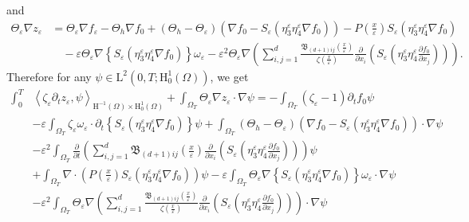 \documentclass[preprint, 12pt]{amsart}
\numberwithin{equation}{section}
\numberwithin{equation}{section}
\newcommand{\xeps}{\left(\frac{x}{\varepsilon}\right)}
\newcommand{\eps}{\varepsilon}
\begin{document}
and
\begin{equation*}
\begin{aligned}
\Theta_\eps \nabla z_\eps 
& = \Theta_\eps \nabla f_\eps
- \Theta_h \nabla f_0 
+ \left(\Theta_h - \Theta_\eps\right) \left( \nabla f_0 - S_\eps \left( \eta_3^\eps \eta_4^\eps \nabla f_0 \right) \right)
- P\xeps S_\eps \left( \eta_3^\eps \eta_4^\eps \nabla f_0 \right)
\\
& \quad 
- \eps \Theta_\eps \nabla \left\{S_\eps \left( \eta_3^\eps \eta_4^\eps \nabla f_0 \right)\right\} \omega_\eps
- \eps^2 \Theta_\eps\nabla \left(\sum_{i,j=1}^d \frac{\mathfrak{B}_{(d+1)ij}\xeps}{\zeta\xeps} \frac{\partial}{\partial x_i} \left(S_\eps \left( \eta_3^\eps \eta_4^\eps \frac{\partial f_0}{\partial x_j}\right)\right)\right).
\end{aligned}
\end{equation*}
Therefore for any $\psi\in\mathrm L^2(0,T;\mathrm H^1_0(\Omega))$, we get
\begin{equation}\label{eq:wk-form-1}
\begin{aligned}
\int_0^T & \left\langle \zeta_\eps\partial_{t}z_{\varepsilon},\psi \right\rangle_{\mathrm{H}^{-1}(\Omega) \times \mathrm{H}_0^1(\Omega)} 
+ \int_{\Omega_T} \Theta_\eps\nabla z_{\varepsilon} \cdot \nabla \psi
= - \int_{\Omega_T} (\zeta_\eps -1)\partial_{t}f_{0}\psi
\\
& - \eps \int_{\Omega_T} \zeta_\eps \omega_\eps\cdot \partial_t \left\{S_\eps \left( \eta_3^\eps \eta_4^\eps \nabla f_0 \right)\right\} \psi
+ \int_{\Omega_T}\left(\Theta_h - \Theta_\eps\right) \left( \nabla f_0 - S_\eps \left( \eta_3^\eps \eta_4^\eps \nabla f_0 \right) \right) \cdot \nabla \psi
\\
& - \eps^2 \int_{\Omega_T} \frac{\partial}{\partial t} \left( \sum_{i,j=1}^d \mathfrak{B}_{(d+1)ij}\xeps \frac{\partial}{\partial x_i} \left(S_\eps \left( \eta_3^\eps \eta_4^\eps \frac{\partial f_0}{\partial x_j}\right)\right)\right) \psi
\\
& + \int_{\Omega_T} \nabla \cdot \left( P\xeps S_\eps \left( \eta_3^\eps \eta_4^\eps \nabla f_0 \right) \right) \psi
- \eps \int_{\Omega_T} \Theta_\eps \nabla \left\{S_\eps \left( \eta_3^\eps \eta_4^\eps \nabla f_0 \right)\right\} \omega_\eps \cdot \nabla \psi
\\
&- \eps^2 \int_{\Omega_T} \Theta_\eps\nabla \left(\sum_{i,j=1}^d \frac{\mathfrak{B}_{(d+1)ij}\xeps}{\zeta\xeps} \frac{\partial}{\partial x_i} \left(S_\eps \left( \eta_3^\eps \eta_4^\eps \frac{\partial f_0}{\partial x_j}\right)\right)\right) \cdot \nabla \psi
\end{aligned}
\end{equation}
\end{document}
